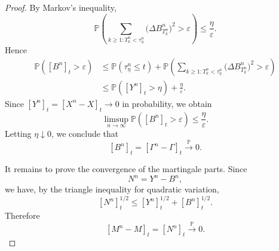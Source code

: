 \documentclass[10pt,a4paper]{amsart}
\begin{document}
\begin{proof}
By Markov's inequality,
\[
\mathbb P\!\left(
        \sum_{k\ge1:T^n_k<\tau^n_\eta}
        \bigl(\Delta B^n_{T^n_k}\bigr)^2
        >\varepsilon
        \right)
        \le
        \frac{\eta}{\varepsilon}.
\]
Hence
\[
\begin{aligned}
\mathbb P\!\left([B^n]_t>\varepsilon\right)
&\le
\mathbb P(\tau^n_\eta\le t)
+
\mathbb P\!\left(
        \sum_{k\ge1:T^n_k<\tau^n_\eta}
        \bigl(\Delta B^n_{T^n_k}\bigr)^2
        >\varepsilon
        \right)
\\
&\le
\mathbb P([Y^n]_t>\eta)
+
\frac{\eta}{\varepsilon}.
\end{aligned}
\]
Since \([Y^n]_t=[X^n-X]_t\to0\) in probability, we obtain
\[
        \limsup_{n\to\infty}
        \mathbb P\!\left([B^n]_t>\varepsilon\right)
        \le
        \frac{\eta}{\varepsilon}.
\]
Letting \(\eta\downarrow0\), we conclude that
\[
        [B^n]_t=[\Gamma^n-\Gamma]_t
        \xrightarrow{\mathbb P}0 .
\]

It remains to prove the convergence of the martingale parts. Since
\[
        N^n=Y^n-B^n,
\]
we have, by the triangle inequality for quadratic variation,
\[
        [N^n]_t^{1/2}
        \le
        [Y^n]_t^{1/2}
        +
        [B^n]_t^{1/2}.
\]
Therefore
\[
        [M^n-M]_t=[N^n]_t
        \xrightarrow{\mathbb P}0 .
\]
\end{proof}
\end{document}
